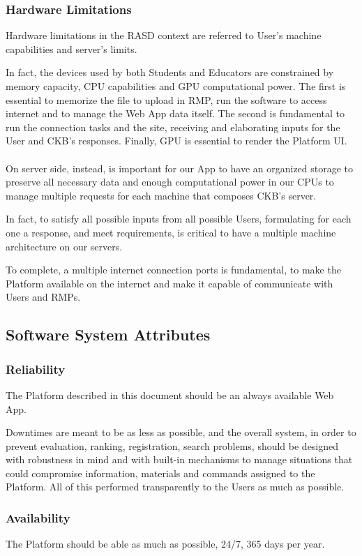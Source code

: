 \subsubsection{Hardware Limitations}
Hardware limitations in the RASD context are referred to User's machine capabilities and server's limits. 

In fact, the devices used by both Students and Educators are constrained by memory capacity, CPU capabilities and GPU computational power. The first is essential to memorize the file to upload in RMP, run the software to access internet
 and to manage the Web App data itself. The second is fundamental to run the connection tasks and the site, receiving and elaborating inputs for the User and CKB's responses. Finally, GPU is essential to render the Platform UI.\\
\\
 On server side, instead, is important for our App to have an organized storage to preserve all necessary data and enough computational power in our CPUs to manage multiple requests for each machine that composes CKB's server. 
 
In fact, to satisfy all possible inputs from all possible Users, formulating for each one a response, and meet requirements, is critical to have a multiple machine architecture on our servers. 

To complete, a multiple internet connection ports is fundamental, to make the Platform available on the internet and make it capable of communicate with Users and RMPs.

\subsection{Software System Attributes}

\subsubsection{Reliability}
The Platform described in this document should be an always available Web App. 

Downtimes are meant to be as less as possible, and the overall system, in order to prevent evaluation, ranking, registration, search problems, should be designed with robustness in mind and with built-in mechanisms to manage situations 
that could compromise information, materials and commands assigned to the Platform. All of this performed transparently to the Users as much as possible.

\subsubsection{Availability}
The Platform should be able as much as possible, 24/7, 365 days per year. 

